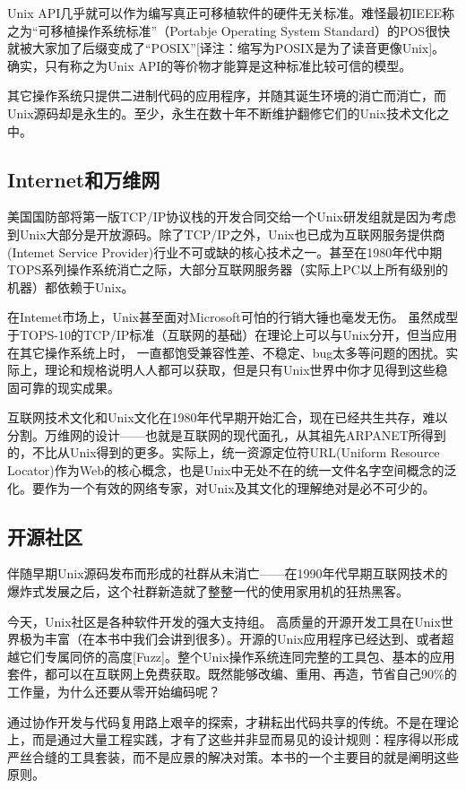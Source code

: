 \documentclass[11pt,oneside]{book}
\begin{document}
\begin{common-format}
Unix API几乎就可以作为编写真正可移植软件的硬件无关标准。难怪最初IEEE称之为“可移植操作系统标准”（Portabje Operating System Standard）的POS很快就被大家加了后缀变成了“POSIX”[译注：缩写为POSIX是为了读音更像Unix]。  确实，只有称之为Unix API的等价物才能算是这种标准比较可信的模型。

其它操作系统只提供二进制代码的应用程序，并随其诞生环境的消亡而消亡，而Unix源码却是永生的。至少，永生在数十年不断维护翻修它们的Unix技术文化之中。

\subsection{Internet和万维网}
美国国防部将第一版TCP/IP协议栈的开发合同交给一个Unix研发组就是因为考虑到Unix大部分是开放源码。除了TCP/IP之外，Unix也已成为互联网服务提供商(Intemet Service Provider)行业不可或缺的核心技术之一。甚至在1980年代中期TOPS系列操作系统消亡之际，大部分互联网服务器（实际上PC以上所有级别的机器）都依赖于Unix。

在Intemet市场上，Unix甚至面对Microsoft可怕的行销大锤也毫发无伤。  虽然成型于TOPS-10的TCP/IP标准（互联网的基础）在理论上可以与Unix分开，但当应用在其它操作系统上时，  一直都饱受兼容性差、不稳定、bug太多等问题的困扰。实际上，理论和规格说明人人都可以获取，但是只有Unix世界中你才见得到这些稳固可靠的现实成果。

互联网技术文化和Unix文化在1980年代早期开始汇合，现在已经共生共存，难以分割。万维网的设计——也就是互联网的现代面孔，从其祖先ARPANET所得到的，不比从Unix得到的更多。实际上，统一资源定位符URL(Uniform Resource Locator)作为Web的核心概念，也是Unix中无处不在的统一文件名字空间概念的泛化。要作为一个有效的网络专家，对Unix及其文化的理解绝对是必不可少的。

\subsection{开源社区}
伴随早期Unix源码发布而形成的社群从未消亡——在1990年代早期互联网技术的爆炸式发展之后，这个社群新造就了整整一代的使用家用机的狂热黑客。

今天，Unix社区是各种软件开发的强大支持组。  高质量的开源开发工具在Unix世界极为丰富（在本书中我们会讲到很多）。开源的Unix应用程序已经达到、或者超越它们专属同侪的高度[Fuzz]。整个Unix操作系统连同完整的工具包、基本的应用套件，都可以在互联网上免费获取。既然能够改编、重用、再造，节省自己90\%的工作量，为什么还要从零开始编码呢？

通过协作开发与代码复用路上艰辛的探索，才耕耘出代码共享的传统。不是在理论上，而是通过大量工程实践，才有了这些并非显而易见的设计规则：程序得以形成严丝合缝的工具套装，而不是应景的解决对策。本书的一个主要目的就是阐明这些原则。


\end{common-format}
\end{document}
